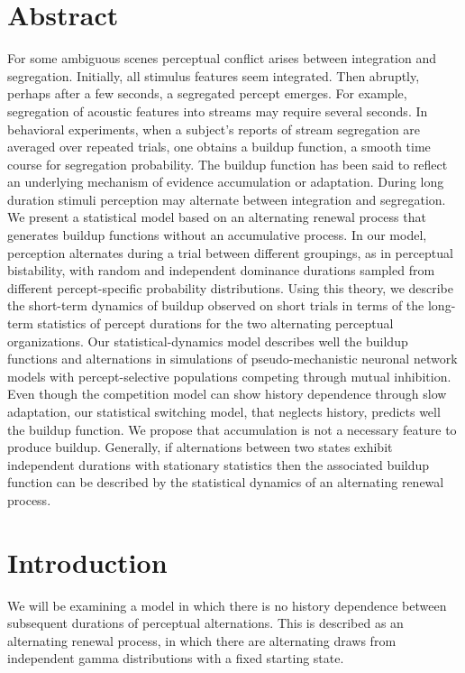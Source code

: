 \section{Abstract}

For some ambiguous scenes perceptual conflict arises between integration and segregation. Initially, all stimulus features seem integrated. Then abruptly, perhaps after a few seconds, a segregated percept emerges. For example, segregation of acoustic features into streams may require several seconds. In behavioral experiments, when a subject’s reports of stream segregation are averaged over repeated trials, one obtains a buildup function, a smooth time course for segregation probability. The buildup function has been said to reflect an underlying mechanism of evidence accumulation or adaptation. During long duration stimuli perception may alternate between integration and segregation. We present a statistical model based on an alternating renewal process that generates buildup functions without an accumulative process. In our model, perception alternates during a trial between different groupings, as in perceptual bistability, with random and independent dominance durations sampled from different percept-specific probability distributions. Using this theory, we describe the short-term dynamics of buildup observed on short trials in terms of the long-term statistics of percept durations for the two alternating perceptual organizations. Our statistical-dynamics model describes well the buildup functions and alternations in simulations of pseudo-mechanistic neuronal network models with percept-selective populations competing through mutual inhibition. Even though the competition model can show history dependence through slow adaptation, our statistical switching model, that neglects history, predicts well the buildup function. We propose that accumulation is not a necessary feature to produce buildup. Generally, if alternations between two states exhibit independent durations with stationary statistics then the associated buildup function can be described by the statistical dynamics of an alternating renewal process.

\section{Introduction}

We will be examining a model in which there is no history dependence between subsequent durations of perceptual alternations. This is described as an alternating renewal process, in which there are alternating draws from independent gamma distributions with a fixed starting state.

